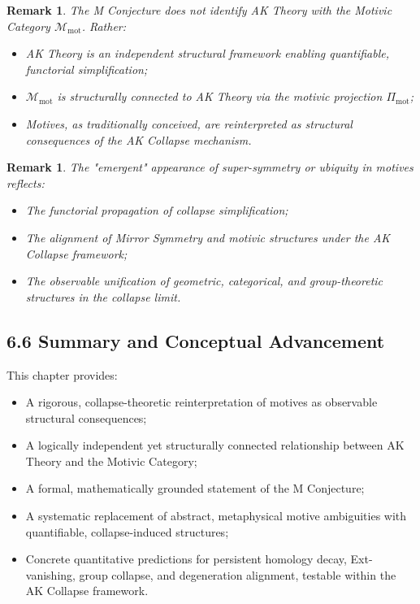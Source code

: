 \documentclass[11pt]{article}
\newtheorem{remark}[theorem]{Remark}
\begin{document}
\begin{remark}
The M Conjecture does not identify AK Theory with the Motivic Category $\mathcal{M}_{\mathrm{mot}}$. Rather:

\begin{itemize}
    \item AK Theory is an independent structural framework enabling quantifiable, functorial simplification;
    \item $\mathcal{M}_{\mathrm{mot}}$ is structurally connected to AK Theory via the motivic projection $\Pi_{\mathrm{mot}}$;
    \item Motives, as traditionally conceived, are reinterpreted as structural consequences of the AK Collapse mechanism.
\end{itemize}
\end{remark}

\begin{remark}
The "emergent" appearance of super-symmetry or ubiquity in motives reflects:

\begin{itemize}
    \item The functorial propagation of collapse simplification;
    \item The alignment of Mirror Symmetry and motivic structures under the AK Collapse framework;
    \item The observable unification of geometric, categorical, and group-theoretic structures in the collapse limit.
\end{itemize}
\end{remark}

\subsection{6.6 Summary and Conceptual Advancement}

This chapter provides:

\begin{itemize}
    \item A rigorous, collapse-theoretic reinterpretation of motives as observable structural consequences;
    \item A logically independent yet structurally connected relationship between AK Theory and the Motivic Category;
    \item A formal, mathematically grounded statement of the M Conjecture;
    \item A systematic replacement of abstract, metaphysical motive ambiguities with quantifiable, collapse-induced structures;
    \item Concrete quantitative predictions for persistent homology decay, Ext-vanishing, group collapse, and degeneration alignment, testable within the AK Collapse framework.
\end{itemize}
\end{document}
